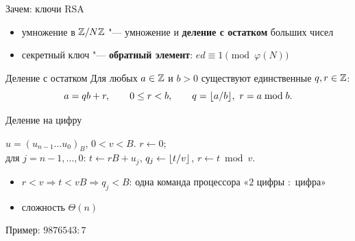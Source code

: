 \documentclass{ca-slides}
\author{}
\begin{document}
\titleframe

\begin{canvasframe}{Зачем: ключи RSA}
  \centering
  \begin{itemize}
    \item умножение в $\mathbb{Z}/N\mathbb{Z}$ "--- умножение и \textbf{деление с остатком} больших чисел
    \item секретный ключ "--- \textbf{обратный элемент}: $ed \equiv 1 \pmod{\varphi(N)}$
  \end{itemize}
\end{canvasframe}

\begin{theoremframe}{Деление с остатком}
  Для любых $a \in \mathbb{Z}$ и $b > 0$ существуют единственные $q, r \in \mathbb{Z}$:
  \[a = qb + r, \qquad 0 \le r < b, \qquad q = \lfloor a/b\rfloor,\ r = a \bmod b.\]
\end{theoremframe}

\begin{canvasframe}{Деление на цифру}
  \begin{algorithm}
    $u = (u_{n-1} \dots u_0)_B$, $0 < v < B$. \quad $r \gets 0$;\\
    для $j = n - 1, \dots, 0$: \quad $t \gets rB + u_j$, \quad $q_j \gets \lfloor t/v\rfloor$, \quad
    $r \gets t \bmod v$.
  \end{algorithm}
  \begin{itemize}
    \item $r < v \Rightarrow t < vB \Rightarrow q_j < B$: одна команда процессора «$2$ цифры $:$ цифра»
    \item сложность $\Theta(n)$
  \end{itemize}
  Пример: $9876543 : 7$
  \penspace[0.25\textheight]
\end{canvasframe}
\end{document}
